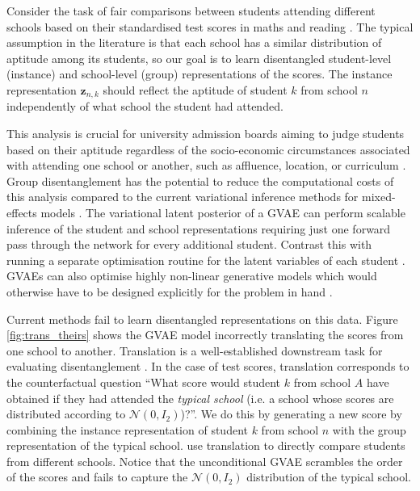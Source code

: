 \documentclass{article} %
\begin{document}
Consider the task of fair comparisons between students attending different schools based on their standardised test scores in maths and reading \citep{Braun2006ComparingPS}. The typical assumption in the literature is that each school has a similar distribution of aptitude among its students, so our goal is to learn disentangled student-level (instance) and school-level (group) representations of the scores. The instance representation $\mathbf{z}_{n,k}$ should reflect the aptitude of student $k$ from school $n$ independently of what school the student had attended.

This analysis is crucial for university admission boards aiming to judge students based on their aptitude regardless of the socio-economic circumstances associated with attending one school or another, such as affluence, location, or curriculum \citep{Raudenbush1995TheEO, Braun2006ComparingPS}. Group disentanglement has the potential to reduce the computational costs of this analysis compared to the current variational inference methods for mixed-effects models \citep{Gelman2006Data}. The variational latent posterior of a GVAE can perform scalable inference of the student and school representations requiring just one forward pass through the network for every additional student. Contrast this with running a separate optimisation routine for the latent variables of each student \citep{Gelman1995BayesianDA}. GVAEs can also optimise highly non-linear generative models which would otherwise have to be designed explicitly for the problem in hand \citep{Pinheiro2001MixedEffectsMI}.

Current methods fail to learn disentangled representations on this data. Figure \ref{fig:trans_theirs} shows the GVAE model \citep{Hosoya2019GroupbasedLO} incorrectly translating the scores from one school to another. Translation is a well-established downstream task for evaluating disentanglement \citep{Tenenbaum2000SeparatingSA}. In the case of test scores, translation corresponds to the counterfactual question ``What score would student $k$ from school $A$ have obtained if they had attended the \textit{typical school} (i.e. a school whose scores are distributed according to $\mathcal{N}(0,I_2)$)?''. We do this by generating a new score by combining the instance representation of student $k$ from school $n$ with the group representation of the typical school. \citet{Raudenbush1995TheEO} use translation to directly compare students from different schools. Notice that the unconditional GVAE scrambles the order of the scores and fails to capture the $\mathcal{N}(0,I_2)$ distribution of the typical school.
\end{document}
